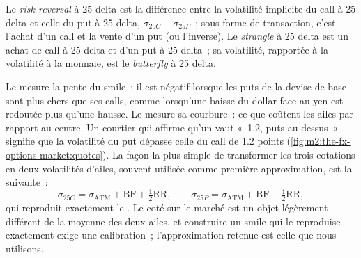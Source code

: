 \begin{definition}\label{def:m2:the-fx-options-market:rr}
Le \emph{risk reversal} à 25 delta est la différence entre
la volatilité implicite du call à 25 delta et celle du put à 25 delta,
$\sigma_{25C} - \sigma_{25P}$~; sous forme de transaction, c'est l'achat d'un call et la vente d'un put (ou
l'inverse). Le \emph{strangle} à 25 delta est un achat de call à 25 delta
et d'un put à 25 delta~; sa volatilité, rapportée à la volatilité à la monnaie, est
le \emph{butterfly} à 25 delta.
\end{definition}

Le  mesure la pente du smile~: il est négatif lorsque les puts de la devise de base
sont plus chers que ses calls, comme lorsqu'une baisse du dollar face au yen est
redoutée plus qu'une hausse. Le  mesure sa courbure~: ce que coûtent les ailes
par rapport au centre. Un courtier qui affirme qu'un  vaut «~1.2, puts au-dessus~»
signifie que la volatilité du put dépasse celle du call de 1.2 points
(\cref{fig:m2:the-fx-options-market:quotes}). La façon la plus simple
de transformer les trois cotations en deux volatilités d'ailes, souvent utilisée comme première
approximation, est la suivante~:
\begin{equation}\label{eq:m2:the-fx-options-market:simplified}
\sigma_{25C} = \sigma_{\mathrm{ATM}} + \mathrm{BF} + \tfrac12\mathrm{RR}, \qquad
\sigma_{25P} = \sigma_{\mathrm{ATM}} + \mathrm{BF} - \tfrac12\mathrm{RR},
\end{equation}
qui reproduit exactement le . Le  coté sur le marché est un objet
légèrement différent de la moyenne des deux ailes, et construire un smile
qui le reproduise exactement exige une calibration~; l'approximation retenue est celle que nous
utilisons.

